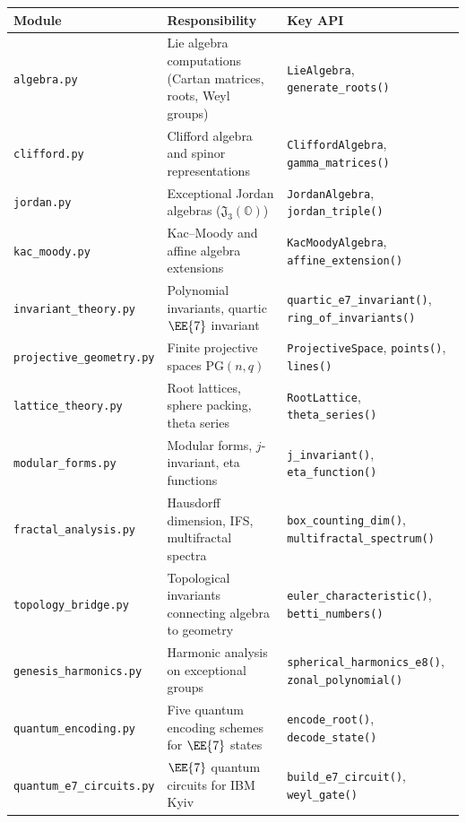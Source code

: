 \begin{longtable}{p{4.5cm}p{4cm}p{5cm}}
\toprule
\textbf{Module} & \textbf{Responsibility} & \textbf{Key API} \\
\midrule
\endhead
\texttt{algebra.py} &
    Lie algebra computations (Cartan matrices, roots, Weyl groups) &
    \texttt{LieAlgebra}, \texttt{generate\_roots()} \\
\texttt{clifford.py} &
    Clifford algebra and spinor representations &
    \texttt{CliffordAlgebra}, \texttt{gamma\_matrices()} \\
\texttt{jordan.py} &
    Exceptional Jordan algebras ($\mathfrak{J}_3(\mathbb{O})$) &
    \texttt{JordanAlgebra}, \texttt{jordan\_triple()} \\
\texttt{kac\_moody.py} &
    Kac--Moody and affine algebra extensions &
    \texttt{KacMoodyAlgebra}, \texttt{affine\_extension()} \\
\texttt{invariant\_theory.py} &
    Polynomial invariants, quartic $\EE{7}$ invariant &
    \texttt{quartic\_e7\_invariant()}, \texttt{ring\_of\_invariants()} \\
\texttt{projective\_geometry.py} &
    Finite projective spaces PG$(n,q)$ &
    \texttt{ProjectiveSpace}, \texttt{points()}, \texttt{lines()} \\
\texttt{lattice\_theory.py} &
    Root lattices, sphere packing, theta series &
    \texttt{RootLattice}, \texttt{theta\_series()} \\
\texttt{modular\_forms.py} &
    Modular forms, $j$-invariant, eta functions &
    \texttt{j\_invariant()}, \texttt{eta\_function()} \\
\texttt{fractal\_analysis.py} &
    Hausdorff dimension, IFS, multifractal spectra &
    \texttt{box\_counting\_dim()}, \texttt{multifractal\_spectrum()} \\
\texttt{topology\_bridge.py} &
    Topological invariants connecting algebra to geometry &
    \texttt{euler\_characteristic()}, \texttt{betti\_numbers()} \\
\texttt{genesis\_harmonics.py} &
    Harmonic analysis on exceptional groups &
    \texttt{spherical\_harmonics\_e8()}, \texttt{zonal\_polynomial()} \\
\texttt{quantum\_encoding.py} &
    Five quantum encoding schemes for $\EE{7}$ states &
    \texttt{encode\_root()}, \texttt{decode\_state()} \\
\texttt{quantum\_e7\_circuits.py} &
    $\EE{7}$ quantum circuits for IBM Kyiv &
    \texttt{build\_e7\_circuit()}, \texttt{weyl\_gate()} \\

\end{longtable}
